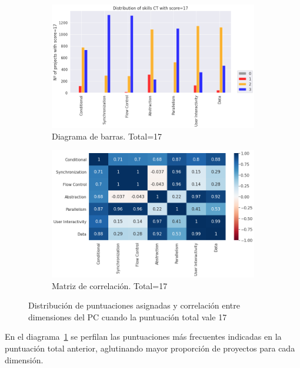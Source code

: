 \documentclass[a4paper, 12pt]{book}
\begin{document}
\begin{figure}[H]
    \centering
    \begin{subfigure}[h]{.49\textwidth} 
        \includegraphics[width=\textwidth]{img/distribucion_17_Snap}
        \caption{Diagrama de barras. Total=17}
        \label{fig:total17_Snap}
    \end{subfigure}       
    \begin{subfigure}[h]{.49\textwidth} 
        \includegraphics[width=\textwidth]{img/corr_17_Snap}
        \caption{Matriz de correlación. Total=17}
        \label{fig:corr17_Snap}
    \end{subfigure}
    \caption{Distribución de puntuaciones asignadas y correlación entre dimensiones del PC cuando la puntuación total vale 17}
\end{figure}

En el diagrama~\ref{fig:total17_Snap} se perfilan las puntuaciones más frecuentes indicadas en la puntuación total anterior, aglutinando mayor proporción de proyectos para cada dimensión.
\end{document}
